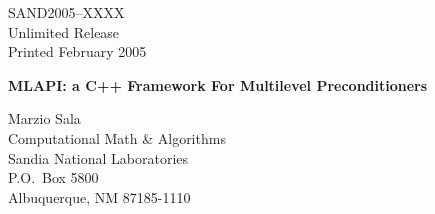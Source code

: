 \documentclass{article}[11pt]
\newcommand{\MLAPIns}  {{\sc MLAPI}}
\def\draft{%
\special{!userdict begin /bop-hook{gsave
200 30 translate 65 rotate
/Times-Roman findfont 216 scalefont setfont
0 0 moveto 0.9 setgray (DRAFT) show grestore}def end}
}
\begin{document}

\setcounter{page}{3}

\large


%
%
\begin{center}
SAND2005--XXXX \\
Unlimited Release \\
Printed February 2005
\end{center}

\vspace{0.2in}

\begin{center}
{\Large {\bf \MLAPIns: a C++ Framework For Multilevel Preconditioners}}

\vspace*{0.8in}
Marzio  Sala \\
Computational Math \& Algorithms \\
Sandia National Laboratories\\
P.O.~Box 5800 \\
Albuquerque, NM 87185-1110
\vspace*{1in}

\end{center}
\end{document}
